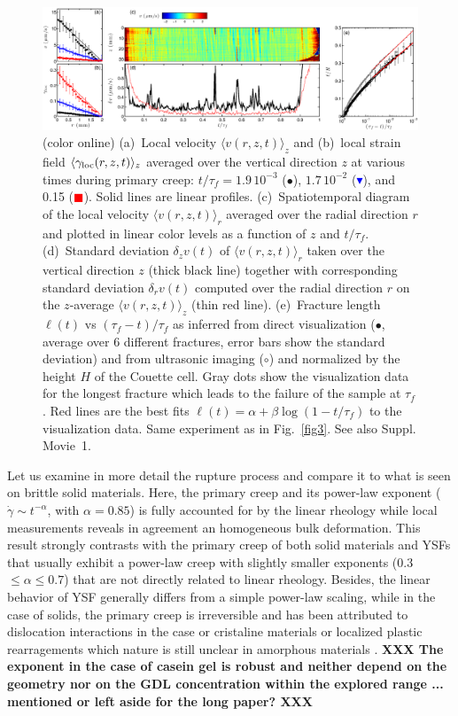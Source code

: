 \documentclass[twocolumn,superscriptaddress,showpacs,preprintnumbers,amsmath,amssymb,prl]{revtex4}
\newcommand\gl{\gamma_{\rm loc}}
\newcommand{\ti}[1]{\textbf{\color{blue}#1}} %
\begin{document}
\begin{figure}
\centering
\includegraphics[width=18cm,clip]{Fig4.eps}
\caption{(color online) (a)~Local velocity $\langle v(r,z,t)\rangle_z$ and (b)~local strain field $\langle\gl(r,z,t)\rangle_z$ averaged over the vertical direction $z$ at various times during primary creep: $t/\tau_f=1.9\,10^{-3}$ ($\bullet$), $1.7\,10^{-2}$ (\textcolor{blue}{$\blacktriangledown$}), and 0.15 (\textcolor{red}{$\blacksquare$}). Solid lines are linear profiles. (c)~Spatiotemporal diagram of the local velocity $\langle v(r,z,t)\rangle_r$ averaged over the radial direction $r$ and plotted in linear color levels as a function of $z$ and $t/\tau_f$. (d)~Standard deviation $\delta_z v(t)$ of $\langle v(r,z,t)\rangle_r$ taken over the vertical direction $z$ (thick black line) together with corresponding standard deviation $\delta_r v(t)$ computed over the radial direction $r$ on the $z$-average $\langle v(r,z,t)\rangle_z$ (thin red line). (e)~Fracture length $\ell(t)$ vs $(\tau_f-t)/\tau_f$ as inferred from direct visualization ($\bullet$, average over 6 different fractures, error bars show the standard deviation) and from ultrasonic imaging ($\circ$) and normalized by the height $H$ of the Couette cell. Gray dots show the visualization data for the longest fracture which leads to the failure of the sample at $\tau_f$. Red lines are the best fits $\ell(t)=\alpha+\beta\log(1-t/\tau_f)$ to the visualization data. Same experiment as in Fig.~\ref{fig3}. See also Suppl. Movie~1.
\label{fig4}}
\end{figure} 

Let us examine in more detail the rupture process and compare it to what is seen on brittle solid materials. Here, the primary creep and its power-law exponent ($\dot \gamma \sim t^{-\alpha}$, with $\alpha=0.85$) is fully accounted for by the linear rheology while local measurements reveals in agreement an homogeneous bulk deformation. This result strongly contrasts with the primary creep of both solid materials and YSFs \cite{Bauer:2006,Divoux:2011,Siebenburger:2012,Grenard:2013} that usually exhibit a power-law creep with slightly smaller exponents (0.3 $\leq \alpha \leq 0.7$) that are not directly related to linear rheology. Besides, the linear behavior of YSF generally differs from a simple power-law scaling, while in the case of solids, the primary creep is irreversible and has been attributed to dislocation interactions in the case or cristaline materials \cite{Miguel:2002} or localized plastic rearragements which nature is still unclear in amorphous materials \cite{Rosti:2010}. \ti{ XXX The exponent in the case of casein gel is robust and neither depend on the geometry nor on the GDL concentration within the explored range ... mentioned or left aside for the long paper? XXX}
\end{document}
